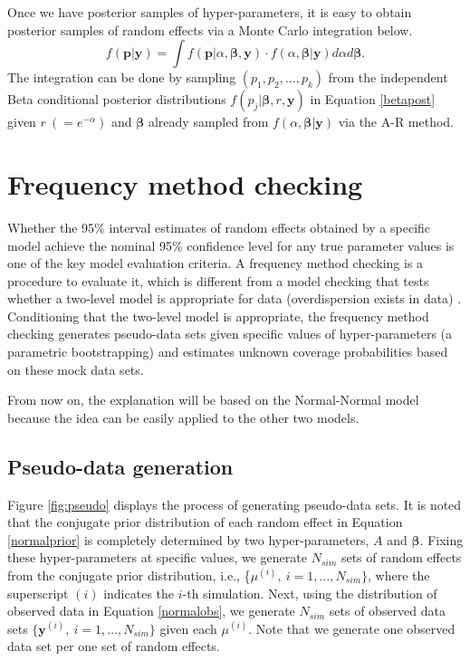 \documentclass[article]{jss}
\begin{document}
Once we have posterior samples of hyper-parameters, it is easy to obtain posterior samples of random effects via a Monte Carlo integration below.
\begin{equation}\label{mcintegration}
f(\boldsymbol{p}\vert \boldsymbol{y})=\int  f(\boldsymbol{p}\vert \alpha, \boldsymbol{\beta}, \boldsymbol{y})\cdot f(\alpha, \boldsymbol{\beta}\vert \boldsymbol{y})d\alpha d\boldsymbol{\beta}.
\end{equation}
The integration can be done by sampling $(p_1, p_2, \ldots, p_k)$ from the independent Beta conditional posterior distributions $f(p_j\vert \boldsymbol{\beta}, r, \boldsymbol{y})$ in Equation \ref{betapost}  given $r~(=e^{-\alpha})$ and $\boldsymbol{\beta}$ already sampled from $f(\alpha, \boldsymbol{\beta}\vert \boldsymbol{y})$ via the A-R method. 




\section{Frequency method checking}\label{sec4}
Whether the 95\%  interval estimates of random effects obtained by a specific model achieve the nominal 95\% confidence level  for any true parameter values is one of the key model evaluation criteria. A frequency method checking is a procedure to evaluate it, which is different from a model checking that tests whether a two-level model is appropriate for data (overdispersion exists in data) \citep{dean1992testing, modelchecking1996}.   Conditioning that the two-level model is appropriate, the frequency method checking   generates pseudo-data sets given specific values of hyper-parameters (a parametric bootstrapping) and estimates unknown coverage probabilities based on these mock data sets.


From now on, the explanation will be based on the Normal-Normal model because the idea can be easily applied to the other two models.




\subsection{Pseudo-data generation}\label{data_generation}
Figure \ref{fig:pseudo} displays the process of generating pseudo-data sets. It is noted that  the conjugate prior distribution of each random effect in Equation \ref{normalprior} is completely determined by two hyper-parameters, $A$ and $\boldsymbol{\beta}$. Fixing these hyper-parameters at specific values, we generate  $N_{sim}$ sets of random effects from the conjugate prior distribution, i.e., \{{\boldmath $\mu$}$^{(i)},~i=1, \ldots, N_{sim}\}$, where the superscript $(i)$ indicates the $i$-th simulation. Next, using the distribution of observed data in Equation \ref{normalobs}, we generate $N_{sim}$ sets of observed data sets $\{\boldsymbol{y}^{(i)},~i=1, \ldots, N_{sim}\}$ given each {\boldmath$\mu$}$^{(i)}$. Note that we generate one observed data set per one set of random effects.
\end{document}
